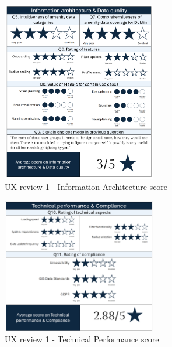 \begin{figure}[htbp]
    \centering
    \includegraphics[width=0.6\textwidth]{images/ux-survey1-data.png}
    \caption{UX review 1 - Information Architecture score}
    \label{fig:ux1datascore}
\end{figure}

\begin{figure}[htbp]
    \centering
    \includegraphics[width=0.6\textwidth]{images/ux-survey1-technical.png}
    \caption{UX review 1 - Technical Performance score}
    \label{fig:ux1compliancescore}
\end{figure}

